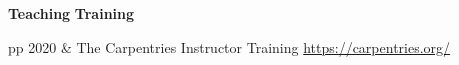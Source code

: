 \documentclass[11pt]{article}
\newcommand{\mysection}[1]{\vspace{1ex} \textbf{\large \textsf{#1} \quad \hrulefill}}
\newcommand{\mysubsection}[1]{\vspace{1ex} \textbf{\textsf{#1}}}
\newcommand{\myref}[1]{\href{#1}{\url{#1}}}
\newlength{\leftcol}
\newlength{\rightcol}
\newcommand{\tdim}{p{\leftcol}p{\rightcol}}
\begin{document}
{{%








\mysection{Teaching}
\mysubsection{Training}
\begin{tabular}{\tdim}
  2020 & The Carpentries Instructor Training
         \newline \myref{https://carpentries.org/} \\
\end{tabular}

}}
\end{document}
